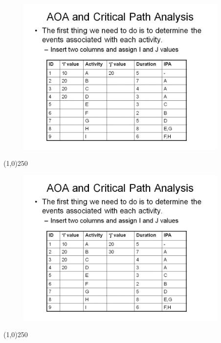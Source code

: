 \begin{frame}
\begin{figure}
	\centering
		\includegraphics[width = 10.5cm]{oldnotes/Slide64.jpg}
\end{figure}
\end{frame}
\begin{center}\line(1,0){250}\end{center}


\begin{frame}
\begin{figure}
	\centering
		\includegraphics[width = 10.5cm]{oldnotes/Slide65.jpg}
\end{figure}
\end{frame}
\begin{center}\line(1,0){250}\end{center}


